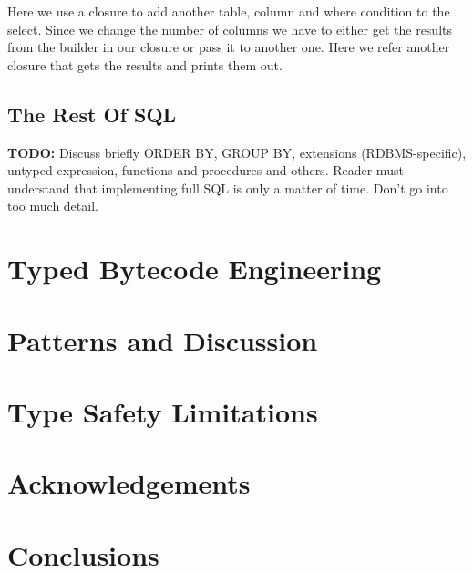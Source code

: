 \documentclass{sig-alternate}
\begin{document}
Here we use a closure to add another table, column and where condition to the select. Since we change the number of columns we have to either get the results from the builder in our closure or pass it to another one. Here we refer another closure that gets the results and prints them out.

\subsection{The Rest Of SQL}

\textbf{TODO:} Discuss briefly ORDER BY, GROUP BY, extensions (RDBMS-specific), untyped expression, functions and procedures and others. Reader must understand that implementing full SQL is only a matter of time. Don't go into too much detail.

\section{Typed Bytecode Engineering}

\section{Patterns and Discussion}

\section{Type Safety Limitations}

\section{Acknowledgements}

\section{Conclusions}



\end{document}
